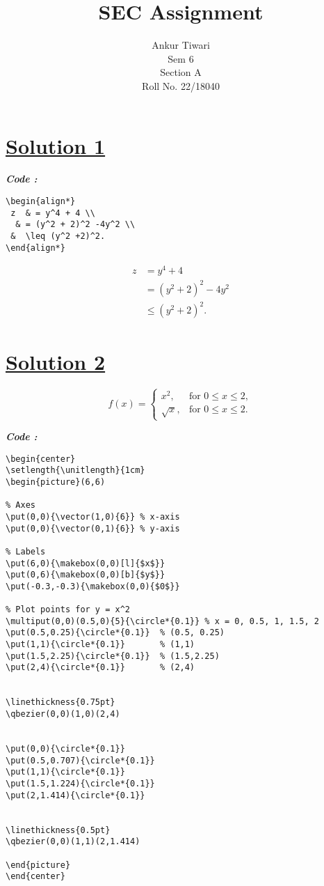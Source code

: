 \documentclass{article}
\title{\textbf{SEC Assignment}}
\author{Ankur Tiwari \\ Sem 6 \\ Section A \\ Roll No. 22/18040}
\date{}
\begin{document}
\maketitle

\section*{\underline{Solution 1}}
\emph{\textbf{Code :}}
\begin{verbatim}
\begin{align*}
 z  & = y^4 + 4 \\
  & = (y^2 + 2)^2 -4y^2 \\
 &  \leq (y^2 +2)^2.  
\end{align*}
\end{verbatim}

\begin{align*}
 z  & = y^4 + 4 \\
  & = (y^2 + 2)^2 -4y^2 \\
 &  \leq (y^2 +2)^2.  
\end{align*}


\section*{\underline{Solution 2}}
\[
f(x) =
\begin{cases}
x^2, & \text{for } 0 \leq x \leq 2, \\
\sqrt{x}, & \text{for } 0 \leq x \leq 2.
\end{cases}
\]

\textbf{\emph{Code :}}
\begin{verbatim}
\begin{center}
\setlength{\unitlength}{1cm}
\begin{picture}(6,6)

% Axes
\put(0,0){\vector(1,0){6}} % x-axis
\put(0,0){\vector(0,1){6}} % y-axis

% Labels
\put(6,0){\makebox(0,0)[l]{$x$}}
\put(0,6){\makebox(0,0)[b]{$y$}}
\put(-0.3,-0.3){\makebox(0,0){$0$}}

% Plot points for y = x^2
\multiput(0,0)(0.5,0){5}{\circle*{0.1}} % x = 0, 0.5, 1, 1.5, 2
\put(0.5,0.25){\circle*{0.1}}  % (0.5, 0.25)
\put(1,1){\circle*{0.1}}       % (1,1)
\put(1.5,2.25){\circle*{0.1}}  % (1.5,2.25)
\put(2,4){\circle*{0.1}}       % (2,4)


\linethickness{0.75pt}
\qbezier(0,0)(1,0)(2,4)


\put(0,0){\circle*{0.1}}   
\put(0.5,0.707){\circle*{0.1}} 
\put(1,1){\circle*{0.1}}       
\put(1.5,1.224){\circle*{0.1}} 
\put(2,1.414){\circle*{0.1}}   


\linethickness{0.5pt}
\qbezier(0,0)(1,1)(2,1.414)

\end{picture}
\end{center}
\end{verbatim}
\end{document}
